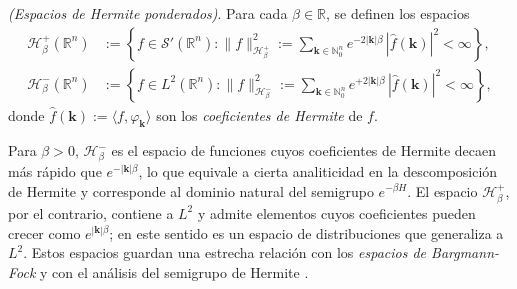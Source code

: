             \begin{definition}\label{def:Hbetapm}
                \textit{(Espacios de Hermite ponderados)}. Para cada $\beta \in \mathbb{R}$, se definen los espacios
                \begin{align}
                    \mathcal{H}_\beta^{+}(\mathbb{R}^n) & := \left\{ f \in \mathcal{S}'(\mathbb{R}^n) : \|f\|_{\mathcal{H}_\beta^+}^2 := \sum_{\boldsymbol{k}\in \mathbb{N}_0^n} e^{-2|\boldsymbol{k}|\beta}\,|\hat{f}(\boldsymbol{k})|^2 < \infty\right\},\\
                    \mathcal{H}_\beta^{-}(\mathbb{R}^n) & := \left\{ f \in L^2(\mathbb{R}^n) : \|f\|_{\mathcal{H}_\beta^-}^2 := \sum_{\boldsymbol{k}\in \mathbb{N}_0^n} e^{+2|\boldsymbol{k}|\beta}\,|\hat{f}(\boldsymbol{k})|^2 < \infty\right\},
                \end{align}
                donde $\hat{f}(\boldsymbol{k}) := \langle f, \varphi_{\boldsymbol{k}}\rangle$ son los \emph{coeficientes de Hermite} de $f$.
            \end{definition}

            \begin{remark}\label{rmk:interpretacion}
                Para $\beta > 0$, $\mathcal{H}_\beta^-$ es el espacio de funciones cuyos coeficientes de Hermite decaen más rápido que $e^{-|\boldsymbol{k}|\beta}$, lo que equivale a cierta analiticidad en la descomposición de Hermite y corresponde al dominio natural del semigrupo $e^{-\beta H}$. El espacio $\mathcal{H}_\beta^+$, por el contrario, contiene a $L^2$ y admite elementos cuyos coeficientes pueden crecer como $e^{|\boldsymbol{k}|\beta}$; en este sentido es un espacio de distribuciones que generaliza a $L^2$. Estos espacios guardan una estrecha relación con los \emph{espacios de Bargmann-Fock} \citep{bargmann1961hilbert,bargmann1967proof} y con el análisis del semigrupo de Hermite \citep{thangavelu1993lectures}.
            \end{remark}

